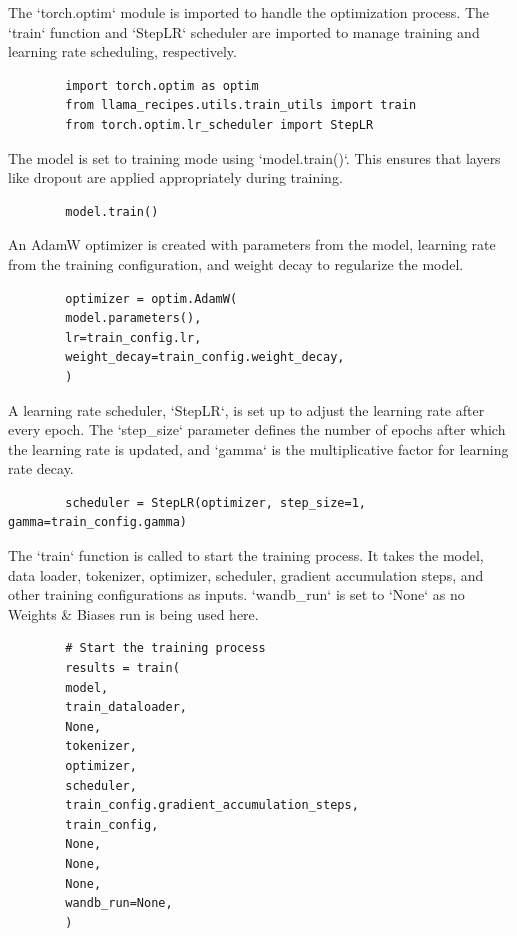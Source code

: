 \documentclass{solutionclass} %
\begin{document}
\begin{solution}
	The `torch.optim` module is imported to handle the optimization process. The `train` function and `StepLR` scheduler are imported to manage training and learning rate scheduling, respectively.
	\begin{lstlisting}
		import torch.optim as optim
		from llama_recipes.utils.train_utils import train
		from torch.optim.lr_scheduler import StepLR
	\end{lstlisting}
\end{solution}

\begin{solution}
	The model is set to training mode using `model.train()`. This ensures that layers like dropout are applied appropriately during training.
	\begin{lstlisting}
		model.train()
	\end{lstlisting}
\end{solution}

\begin{solution}
	An AdamW optimizer is created with parameters from the model, learning rate from the training configuration, and weight decay to regularize the model.
	\begin{lstlisting}
		optimizer = optim.AdamW(
		model.parameters(),
		lr=train_config.lr,
		weight_decay=train_config.weight_decay,
		)
	\end{lstlisting}
\end{solution}

\begin{solution}
	A learning rate scheduler, `StepLR`, is set up to adjust the learning rate after every epoch. The `step\_size` parameter defines the number of epochs after which the learning rate is updated, and `gamma` is the multiplicative factor for learning rate decay.
	\begin{lstlisting}
		scheduler = StepLR(optimizer, step_size=1, gamma=train_config.gamma)
	\end{lstlisting}
\end{solution}

\begin{solution}
	The `train` function is called to start the training process. It takes the model, data loader, tokenizer, optimizer, scheduler, gradient accumulation steps, and other training configurations as inputs. `wandb\_run` is set to `None` as no Weights \& Biases run is being used here.
	\begin{lstlisting}
		# Start the training process
		results = train(
		model,
		train_dataloader,
		None,
		tokenizer,
		optimizer,
		scheduler,
		train_config.gradient_accumulation_steps,
		train_config,
		None,
		None,
		None,
		wandb_run=None,
		)
	\end{lstlisting}
\end{solution}
\end{document}
